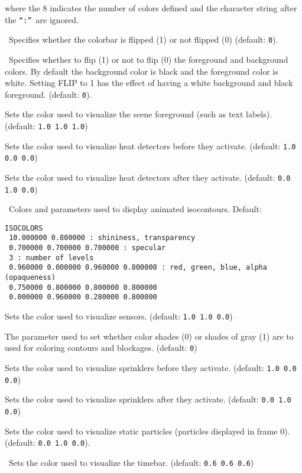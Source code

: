 \documentclass[11pt,twoside]{book}
\newcommand{\hitemNULL}[1]{}
\begin{document}
{\noindent where the 8 indicates the number of colors defined and
the character string after the {\tt ``:''}\ are ignored.

\ Specifies whether the colorbar is flipped (1) or not flipped (0)
(default: {\tt 0}).

\hitemNULL{DIRECTIONCOLOR}
\ Specifies whether to flip (1) or not to flip (0) the foreground and background
colors.  By default the background color is black and the foreground color
is white.  Setting FLIP to 1 has the effect of having a white background and black foreground.
(default: {\tt 0}).

Sets the color used to visualize
the scene foreground (such as text labels).
(default: {\tt 1.0 1.0 1.0})

Sets the color used to visualize
heat detectors before they activate.
(default: {\tt 1.0 0.0 0.0})

Sets the color used to visualize
heat detectors after they activate.
(default: {\tt 0.0 1.0 0.0})


\ Colors and parameters used to display animated isocontours.
Default:
\begin{lstlisting}
ISOCOLORS
 10.000000 0.800000 : shininess, transparency
 0.700000 0.700000 0.700000 : specular
 3 : number of levels
 0.960000 0.000000 0.960000 0.800000 : red, green, blue, alpha (opaqueness)
 0.750000 0.800000 0.800000 0.800000
 0.000000 0.960000 0.280000 0.800000
\end{lstlisting}

Sets the color used to visualize sensors.
(default: {\tt 1.0 1.0 0.0})

The parameter used to set whether color shades (0) or shades of gray (1)
are to used for coloring contours and blockages.
(default: {\tt 0})

Sets the color used to visualize
sprinklers before they activate.
(default: {\tt 1.0 0.0 0.0})

Sets the color used to visualize
sprinklers after they activate.
(default: {\tt 0.0 1.0 0.0})

Sets the color used to visualize static particles (particles
displayed in frame 0).
 (default: {\tt 0.0 1.0 0.0}).

\ Sets the color used to visualize the timebar. (default: {\tt 0.6 0.6 0.6})

}
\end{document}
